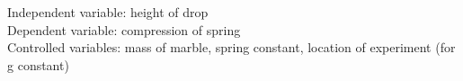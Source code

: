Independent variable: height of drop \\
Dependent variable: compression of spring \\ 
Controlled variables: mass of marble, spring constant, location of experiment (for g constant)